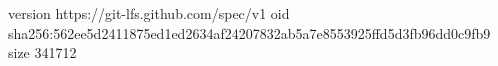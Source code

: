 version https://git-lfs.github.com/spec/v1
oid sha256:562ee5d2411875ed1ed2634af24207832ab5a7e8553925ffd5d3fb96dd0c9fb9
size 341712
